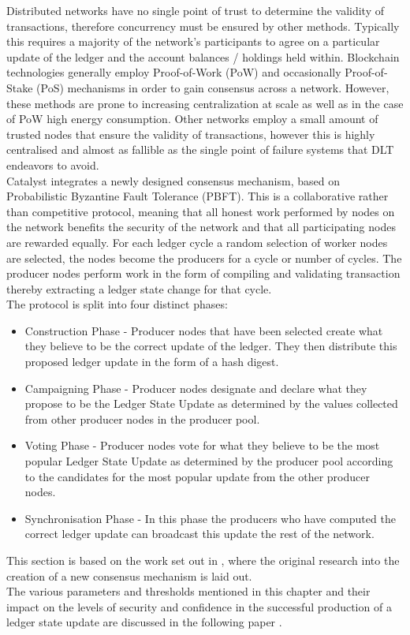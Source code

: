 Distributed networks have no single point of trust to determine the validity of transactions, therefore concurrency must be ensured by other methods. Typically this requires a majority of the network's participants to agree on a particular update of the ledger and the account balances / holdings held within. Blockchain technologies generally employ Proof-of-Work (PoW) and occasionally Proof-of-Stake (PoS) mechanisms in order to gain consensus across a network. However, these methods are prone to increasing centralization at scale as well as in the case of PoW high energy consumption. Other networks employ a small amount of trusted nodes that ensure the validity of transactions, however this is highly centralised and almost as fallible as the single point of failure systems that DLT endeavors to avoid. \\

Catalyst integrates a newly designed consensus mechanism, based on Probabilistic Byzantine Fault Tolerance (PBFT).  This is a collaborative rather than competitive protocol, meaning that all honest work performed by nodes on the network benefits the security of the network and that all participating nodes are rewarded equally. For each ledger cycle a random selection of worker nodes are selected, the nodes become the producers for a cycle or number of cycles. The producer nodes perform work in the form of compiling and validating transaction thereby extracting a ledger state change for that cycle. \\


The protocol is split into four distinct phases:

\begin{itemize}

\item Construction Phase - Producer nodes that have been selected create what they believe to be the correct update of the ledger. They then distribute this proposed ledger update in the form of a hash digest.
\item Campaigning Phase - Producer nodes designate and declare what they propose to be the Ledger State Update as determined by the values collected from other producer nodes in the producer pool.
\item Voting Phase - Producer nodes vote for what they believe to be the most popular Ledger State Update as determined by the producer pool according to the candidates for the most popular update from the other producer nodes.
\item Synchronisation Phase - In this phase the producers who have computed the correct ledger update can broadcast this update the rest of the network.

\end{itemize}

This section is based on the work set out in \cite{catalystresearch}, where the original research into the creation of a new consensus mechanism is laid out. \\

The various parameters and thresholds mentioned in this chapter and their impact on the levels of security and confidence in the successful production of a ledger state update are discussed in the following paper \cite{catalystresearch2}.

